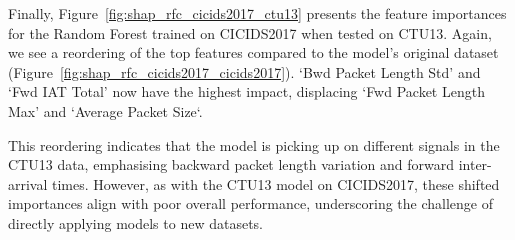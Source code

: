 Finally, Figure~\ref{fig:shap_rfc_cicids2017_ctu13} presents the feature importances for the Random Forest trained on CICIDS2017 when tested on CTU13. Again, we see a reordering of the top features compared to the model's original dataset (Figure~\ref{fig:shap_rfc_cicids2017_cicids2017}). `Bwd Packet Length Std' and `Fwd IAT Total' now have the highest impact, displacing `Fwd Packet Length Max' and `Average Packet Size`.

This reordering indicates that the model is picking up on different signals in the CTU13 data, emphasising backward packet length variation and forward inter-arrival times. However, as with the CTU13 model on CICIDS2017, these shifted importances align with poor overall performance, underscoring the challenge of directly applying models to new datasets.
